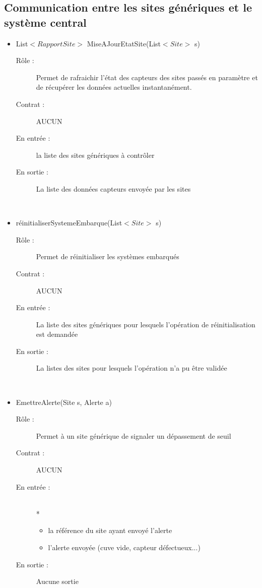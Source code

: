 \subsection{Communication entre les sites génériques et le système central}
\begin{itemize}
	\item List$<RapportSite>$ MiseAJourEtatSite(List$<Site>$  s) 
	\begin{description} 
		\item[Rôle :] Permet de rafraichir l'état des capteurs des sites passés en paramètre et de récupérer les données actuelles instantanément.
		\item[Contrat :] AUCUN 
		\item[En entrée :] la liste des sites génériques à contrôler
		\item[En sortie :] La liste des données capteurs envoyée par les sites
	\end{description}
	~\\
	\item réinitialiserSystemeEmbarque(List$<Site>$  s) 
	\begin{description} 
		\item[Rôle :] Permet de réinitialiser les systèmes embarqués
		\item[Contrat :] AUCUN
		\item[En entrée :] La liste des sites génériques pour lesquels l'opération de réinitialisation est demandée
		\item[En sortie :] La listes des sites pour lesquels l'opération n'a pu être validée 
	\end{description}
	~\\
	\item EmettreAlerte(Site s, Alerte a) 
	\begin{description} 
		\item[Rôle :] Permet à un site générique de signaler un dépassement de seuil
		\item[Contrat :] AUCUN
		\item[En entrée :] 
		~\\*
		\begin{itemize}
			\item la référence du site ayant envoyé l'alerte
			\item l'alerte envoyée (cuve vide, capteur défectueux...)
		\end{itemize}
		\item[En sortie :] Aucune sortie
	\end{description}
	~\\

\end{itemize}



